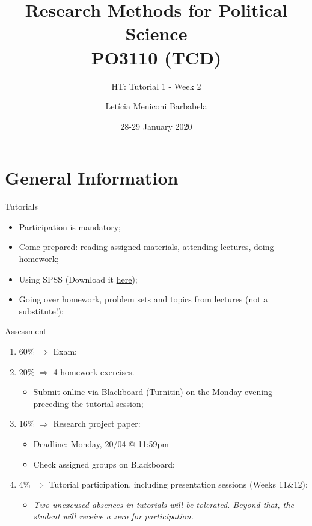 \documentclass[10pt]{beamer}   %
\title{Research Methods for Political Science\\ PO3110 (TCD)}
\subtitle{HT: Tutorial 1 - Week 2}
\date{28-29 January 2020}
\author{Letícia Meniconi Barbabela}
\begin{document}
\begin{frame}
\titlepage
\end{frame}


\section{General Information}

\begin{frame}{Tutorials}

 \begin{itemize}

\item Participation is mandatory;
\item Come prepared: reading assigned materials, attending lectures, doing homework; 
\item Using SPSS (Download it \href{( http://isservices.tcd.ie/software/kb/student_software.php)}{here});
\item Going over homework, problem sets and topics from lectures (not a substitute!);

\end{itemize}
\end{frame}


\begin{frame}{Assessment}
\begin{enumerate}
\item 60\% $\Rightarrow$ Exam;
\item 20\% $\Rightarrow$  4 homework exercises. 
\begin{itemize}
\item Submit online via Blackboard (Turnitin) on the Monday evening preceding the tutorial session;
\end{itemize}
\item 16\% $\Rightarrow$  Research project paper: 
\begin{itemize}
\item Deadline: Monday, 20/04 @ 11:59pm
\item Check assigned groups on Blackboard;
\end{itemize}
\item 4\% $\Rightarrow$  Tutorial participation, including presentation sessions (Weeks 11\&12):
\begin{itemize}
\item \textit{Two unexcused absences in tutorials will be
tolerated. Beyond that, the student will receive a zero for participation.} 
\end{itemize}
\end{enumerate}
\end{frame}
\end{document}
